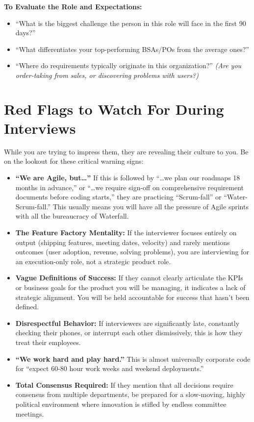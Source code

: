 \textbf{To Evaluate the Role and Expectations:}

\begin{itemize}
\tightlist
\item
  ``What is the biggest challenge the person in this role will face in
  the first 90 days?''
\item
  ``What differentiates your top-performing BSAs/POs from the average
  ones?''
\item
  ``Where do requirements typically originate in this organization?''
  \emph{(Are you order-taking from sales, or discovering problems with
  users?)}
\end{itemize}

\bigskip

\section{Red Flags to Watch For During
Interviews}\label{red-flags-to-watch-for-during-interviews}

While you are trying to impress them, they are revealing their culture
to you. Be on the lookout for these critical warning signs:

\begin{itemize}
\tightlist
\item
  \textbf{``We are Agile, but\ldots{}''} If this is followed by
  ``\ldots we plan our roadmaps 18 months in advance,'' or ``\ldots we
  require sign-off on comprehensive requirement documents before coding
  starts,'' they are practicing ``Scrum-fall'' or ``Water-Scrum-fall.''
  This usually means you will have all the pressure of Agile sprints
  with all the bureaucracy of Waterfall.
\item
  \textbf{The Feature Factory Mentality:} If the interviewer focuses
  entirely on output (shipping features, meeting dates, velocity) and
  rarely mentions outcomes (user adoption, revenue, solving problems),
  you are interviewing for an execution-only role, not a strategic
  product role.
\item
  \textbf{Vague Definitions of Success:} If they cannot clearly
  articulate the KPIs or business goals for the product you will be
  managing, it indicates a lack of strategic alignment. You will be held
  accountable for success that hasn't been defined.
\item
  \textbf{Disrespectful Behavior:} If interviewers are significantly
  late, constantly checking their phones, or interrupt each other
  dismissively, this is how they treat their employees.
\item
  \textbf{``We work hard and play hard.''} This is almost universally
  corporate code for ``expect 60-80 hour work weeks and weekend
  deployments.''
\item
  \textbf{Total Consensus Required:} If they mention that all decisions
  require consensus from multiple departments, be prepared for a
  slow-moving, highly political environment where innovation is stifled
  by endless committee meetings.
\end{itemize}

